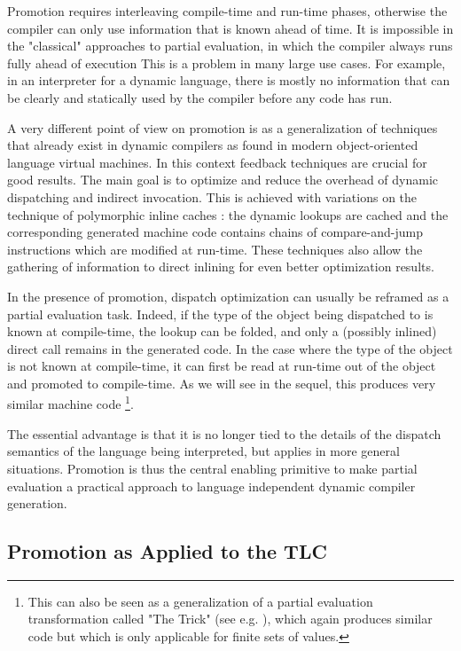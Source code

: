 Promotion requires interleaving compile-time and run-time phases,
otherwise the compiler can only use information that is known ahead of
time. It is impossible in the "classical" approaches to partial
evaluation, in which the compiler always runs fully ahead of execution
This is a problem in many large use cases.  For example, in an
interpreter for a dynamic language, there is mostly no information
that can be clearly and statically used by the compiler before any
code has run.

A very different point of view on promotion is as a generalization of
techniques that already exist in dynamic compilers as found in modern
object-oriented language virtual machines.  In this context feedback
techniques are crucial for good results.  The main goal is to
optimize and reduce the overhead of dynamic dispatching and indirect
invocation.  This is achieved with variations on the technique of
polymorphic inline caches \cite{XXX}: the dynamic lookups are cached and
the corresponding generated machine code contains chains of
compare-and-jump instructions which are modified at run-time.  These
techniques also allow the gathering of information to direct inlining for even
better optimization results.

In the presence of promotion, dispatch optimization can usually be
reframed as a partial evaluation task.  Indeed, if the type of the
object being dispatched to is known at compile-time, the lookup can be
folded, and only a (possibly inlined) direct call remains in the
generated code.  In the case where the type of the object is not known
at compile-time, it can first be read at run-time out of the object and
promoted to compile-time.  As we will see in the sequel, this produces
very similar machine code \footnote{This can also be seen as a generalization of
a partial evaluation transformation called "The Trick" (see e.g. \cite{XXX}),
which again produces similar code but which is only applicable for finite sets
of values.}.

The essential advantage is that it is no longer tied to the details of
the dispatch semantics of the language being interpreted, but applies in
more general situations.  Promotion is thus the central enabling
primitive to make partial evaluation a practical approach to language
independent dynamic compiler generation.

\subsection{Promotion as Applied to the TLC}

